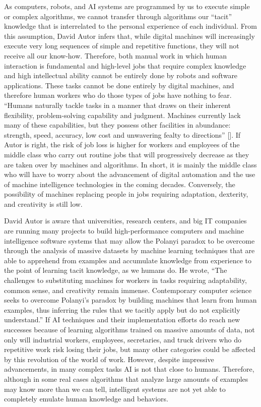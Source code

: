 As computers, robots, and AI systems are programmed by us to execute simple or complex algorithms, we cannot transfer through algorithms our ``tacit'' knowledge that is interrelated to the personal experience of each individual. From this assumption, David Autor infers that, while digital machines will increasingly execute very long sequences of simple and repetitive functions, they will not receive all our know-how. Therefore, both manual work in which human interaction is fundamental and high-level jobs that require complex knowledge and high intellectual ability cannot be entirely done by robots and software applications. These tasks cannot be done entirely by digital machines, and therefore human workers who do those types of jobs have nothing to fear. ``Humans naturally tackle tasks in a manner that draws on their inherent flexibility, problem-solving capability and judgment. Machines currently lack many of these capabilities, but they possess other facilities in abundance: strength, speed, accuracy, low cost and unwavering fealty to directions'' [\citealt{chap:6:Autor:2014}]. If Autor is right, the risk of job loss is higher for workers and employees of the middle class who carry out routine jobs that will progressively decrease as they are taken over by machines and algorithms. In short, it is mainly the middle class who will have to worry about the advancement of digital automation and the use of machine intelligence technologies in the coming decades. Conversely, the possibility of machines replacing people in jobs requiring adaptation, dexterity, and creativity is still low.

David Autor is aware that universities, research centers, and big IT companies are running many projects to build high-performance computers and machine intelligence software systems that may allow the Polanyi paradox to be overcome through the analysis of massive datasets by machine learning techniques that are able to apprehend from examples and accumulate knowledge from experience to the point of learning tacit knowledge, as we humans do. He wrote, ``The challenges to substituting machines for workers in tasks requiring adaptability, common sense, and creativity remain immense. Contemporary computer science seeks to overcome Polanyi's paradox by building machines that learn from human examples, thus inferring the rules that we tacitly apply but do not explicitly understand.'' If AI techniques and their implementation efforts do reach new successes because of learning algorithms trained on massive amounts of data, not only will industrial workers, employees, secretaries, and truck drivers who do repetitive work risk losing their jobs, but many other categories could be affected by this revolution of the world of work. However, despite impressive advancements, in many complex tasks AI is not that close to humans.\vadjust{\vspace*{10pt}\pagebreak} Therefore, although in some real cases \hbox{algorithms} that analyze large amounts of examples may know more than we can tell, intelligent systems are not yet able to completely emulate human knowledge and behaviors.

